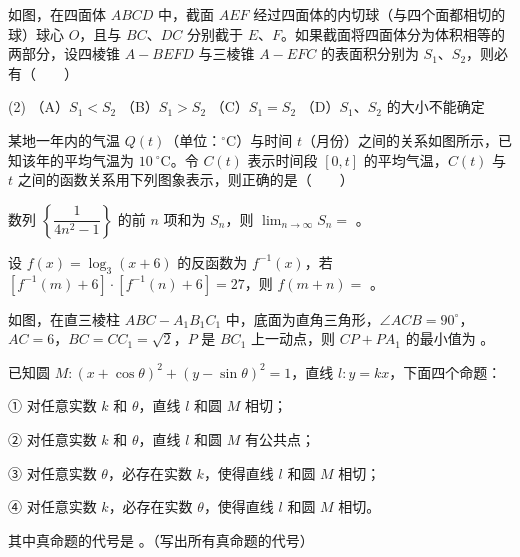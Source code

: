 \begin{question}
如图，在四面体 $ABCD$ 中，截面 $AEF$ 经过四面体的内切球（与四个面都相切的球）球心 $O$，且与 $BC\text{、}DC$ 分别截于 $E\text{、}F$。如果截面将四面体分为体积相等的两部分，设四棱锥 $A-BEFD$ 与三棱锥 $A-EFC$ 的表面积分别为 $S_1\text{、}S_2$，则必有\mbox{（　　）}

\begin{gkopts}(2)
\task （A）$S_1<S_2$
\task （B）$S_1>S_2$
\task （C）$S_1=S_2$
\task （D）$S_1\text{、}S_2$ 的大小不能确定
\end{gkopts}
\nopagebreak[4]
\begin{center}\end{center}
\nopagebreak[4]
\Needspace{0.4\textheight}
\end{question}
\begin{question}
某地一年内的气温 $Q(t)$（单位：$^\circ\mathrm C$）与时间 $t$（月份）之间的关系如图所示，已知该年的平均气温为 $10\ ^\circ\mathrm C$。令 $C(t)$ 表示时间段 $[0,t]$ 的平均气温，$C(t)$ 与 $t$ 之间的函数关系用下列图象表示，则正确的是\mbox{（　　）}
\nopagebreak[4]
\begin{center}\end{center}
\nopagebreak[4]
\end{question}

\begin{question}
数列 $\left\{\dfrac1{4n^2-1}\right\}$ 的前 $n$ 项和为 $S_n$，则 $\lim_{n\to\infty}S_n=$ \gkblank{}。

\end{question}
\begin{question}
设 $f(x)=\log_3(x+6)$ 的反函数为 $f^{-1}(x)$，若 $[f^{-1}(m)+6]\cdot[f^{-1}(n)+6]=27$，则 $f(m+n)=$ \gkblank{}。

\Needspace{0.4\textheight}
\end{question}
\begin{question}
如图，在直三棱柱 $ABC-A_1B_1C_1$ 中，底面为直角三角形，$\angle ACB=90^\circ$，$AC=6\text{，}BC=CC_1=\sqrt2$，$P$ 是 $BC_1$ 上一动点，则 $CP+PA_1$ 的最小值为 \gkblank{}。
\nopagebreak[4]
\begin{center}\end{center}
\nopagebreak[4]
\end{question}
\begin{question}
已知圆 $M:(x+\cos\theta)^2+(y-\sin\theta)^2=1$，直线 $l:y=kx$，下面四个命题：

① 对任意实数 $k$ 和 $\theta$，直线 $l$ 和圆 $M$ 相切；

② 对任意实数 $k$ 和 $\theta$，直线 $l$ 和圆 $M$ 有公共点；

③ 对任意实数 $\theta$，必存在实数 $k$，使得直线 $l$ 和圆 $M$ 相切；

④ 对任意实数 $k$，必存在实数 $\theta$，使得直线 $l$ 和圆 $M$ 相切。

其中真命题的代号是 \gkblank{}。（写出所有真命题的代号）

\end{question}

